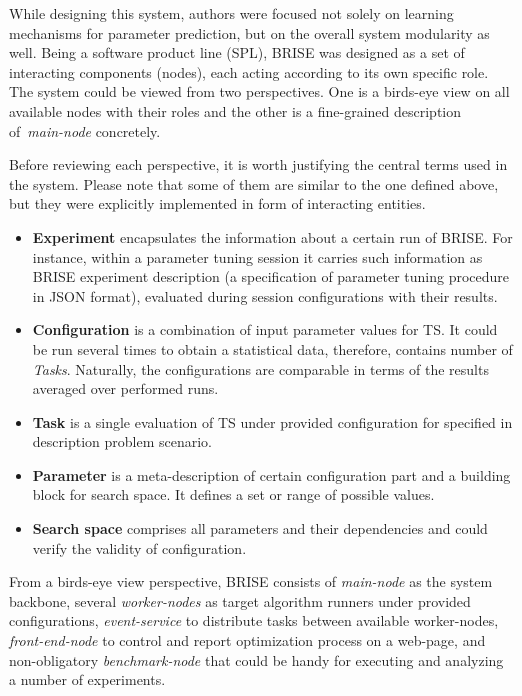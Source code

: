 While designing this system, authors were focused not solely on learning mechanisms for parameter prediction, but on the overall system modularity as well.
Being a software product line (SPL), BRISE was designed as a set of interacting components (nodes), each acting according to its own specific role. 
The system could be viewed from two perspectives. One is a birds-eye view on all available nodes with their roles and the other is a fine-grained description of~\textit{main-node} concretely.

Before reviewing each perspective, it is worth justifying the central terms used in the system. Please note that some of them are similar to the one defined above, but they were explicitly implemented in form of interacting entities.
\begin{itemize}
	\item \textbf{Experiment} encapsulates the information about a certain run of BRISE. For instance, within a parameter tuning session it carries such information as BRISE experiment description (a specification of parameter tuning procedure in JSON format), evaluated during session configurations with their results.

	\item \textbf{Configuration} is a combination of input parameter values for TS. It could be run several times to obtain a statistical data, therefore, contains number of \emph{Tasks}. Naturally, the configurations are comparable in terms of the results averaged over performed runs.

	\item \textbf{Task} is a single evaluation of TS under provided configuration for specified in description problem scenario.

	\item \textbf{Parameter} is a meta-description of certain configuration part and a building block for search space. It defines a set or range of possible values.

	\item \textbf{Search space} comprises all parameters and their dependencies and could verify the validity of configuration.
\end{itemize}

From a birds-eye view perspective, BRISE consists of \emph{main-node} as the system backbone, several \emph{worker-nodes} as target algorithm runners under provided configurations, \emph{event-service} to distribute tasks between available worker-nodes, \emph{front-end-node} to control and report optimization process on a web-page, and non-obligatory \emph{benchmark-node} that could be handy for executing and analyzing a number of experiments.

